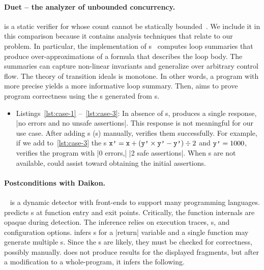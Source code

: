 \paragraph{Duet -- the analyzer of unbounded concurrency.}
 is a static verifier for  whose 
count cannot be statically bounded~\cite{duet}. We include it in this comparison
because it contains analysis techniques that relate to our problem. In
particular, the implementation of {s}~\cite{cyphert2024}
computes {loop summaries} that produce over-approximations of a formula that
describes the loop body. The summaries can capture non-linear
invariants and generalize over arbitrary control
flow. The theory of transition ideals is monotone. In other words, a program
with more precise  yields a more informative loop summary.
Then,  aims to prove program correctness using the s
generated from s.

\begin{itemize}
\item Listings~\ref{lst:case-1} --~\ref{lst:case-3}:
    In absence of s,  produces a
    single response, \pr|no errors and no unsafe assertions|. This response is
    not meaningful for our use case. After adding s
    (s) manually,  verifies them
    successfully. For example, if we add to~\autoref{lst:case-3} the
    s
    \(\prm{x'}=\prm{x}+(\prm{y'}\times\prm{y'}-\prm{y'}) \div 2 \) and
    \(\prm{y'}=1000 \),  verifies the program with \pr|0 errors,|
    \pr|2 safe assertions|. When s are not
    available, \ndx{\impl} could assist  toward obtaining the initial
    assertions.
\end{itemize}

\paragraph{Postconditions with Daikon.}
~\cite{ernst2007,daikon} is a dynamic
 detector with front-ends to support many programming languages.
 predicts s at function entry and exit points.
Critically, the function internals are opaque during  detection.
The inference relies on execution traces, s, and configuration options.  infers s
for a \pr|return| variable and a single function may generate multiple
s. Since the s are likely, they must be
checked for correctness, possibly manually.  does not produce
results for the displayed fragments, but after a modification to a
whole-program, it infers the following.

